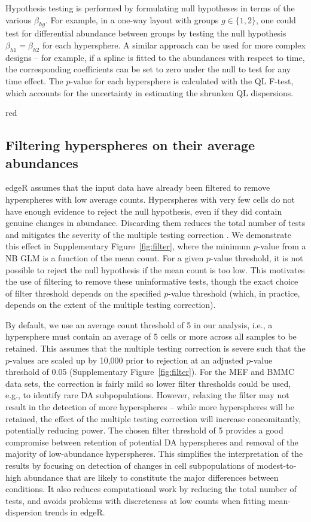 \documentclass{article}
\begin{document}
Hypothesis testing is performed by formulating null hypotheses in terms of the various $\beta_{hg}$.
For example, in a one-way layout with groups $g\in\{1,2\}$, one could test for differential abundance between groups by testing the null hypothesis $\beta_{h1}=\beta_{h2}$ for each hypersphere.
A similar approach can be used for more complex designs -- for example, if a spline is fitted to the abundances with respect to time, the corresponding coefficients can be set to zero under the null to test for any time effect.
The $p$-value for each hypersphere is calculated with the QL F-test, which accounts for the uncertainty in estimating the shrunken QL dispersions. 

\begin{color}{red}
\subsection{Filtering hyperspheres on their average abundances}
edgeR assumes that the input data have already been filtered to remove hyperspheres with low average counts.
Hyperspheres with very few cells do not have enough evidence to reject the null hypothesis, even if they did contain genuine changes in abundance.
Discarding them reduces the total number of tests and mitigates the severity of the multiple testing correction \cite{bourgon2010independent}.
We demonstrate this effect in Supplementary Figure~\ref{fig:filter}, where the minimum $p$-value from a NB GLM is a function of the mean count.
For a given $p$-value threshold, it is not possible to reject the null hypothesis if the mean count is too low.
This motivates the use of filtering to remove these uninformative tests, though the exact choice of filter threshold depends on the specified $p$-value threshold (which, in practice, depends on the extent of the multiple testing correction).

By default, we use an average count threshold of 5 in our analysis, i.e., a hypersphere must contain an average of 5 cells or more across all samples to be retained.
This assumes that the multiple testing correction is severe such that the $p$-values are scaled up by 10,000 prior to rejection at an adjusted $p$-value threshold of 0.05 (Supplementary Figure~\ref{fig:filter}). 
For the MEF and BMMC data sets, the correction is fairly mild so lower filter thresholds could be used, e.g., to identify rare DA subpopulations.
However, relaxing the filter may not result in the detection of more hyperspheres -- while more hyperspheres will be retained, the effect of the multiple testing correction will increase concomitantly, potentially reducing power.
The chosen filter threshold of 5 provides a good compromise between retention of potential DA hyperspheres and removal of the majority of low-abundance hyperspheres.
This simplifies the interpretation of the results by focusing on detection of changes in cell subpopulations of modest-to-high abundance that are likely to constitute the major differences between conditions.
It also reduces computational work by reducing the total number of tests, and avoids problems with discreteness at low counts when fitting mean-dispersion trends in edgeR.
\end{color}
\end{document}
